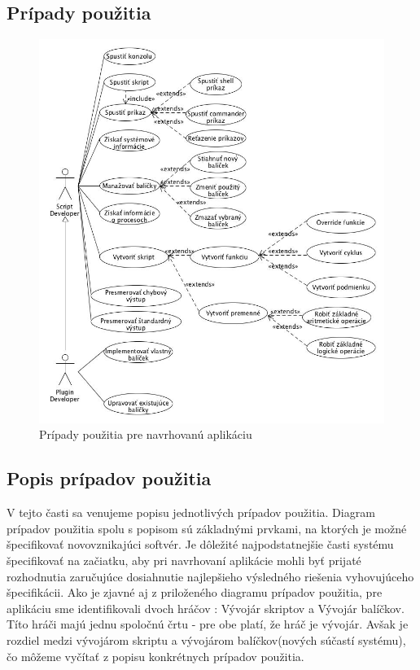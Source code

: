 \subsection{Prípady použitia}
\begin{figure}[!htbp]
	\centering
	\includegraphics[width=\linewidth]{img/usecase.jpg}
	\caption{Prípady použitia pre navrhovanú aplikáciu}
	\label{fig:test}
\end{figure}
\newpage
\subsection{Popis prípadov použitia}
\indent V tejto časti sa venujeme popisu jednotlivých prípadov použitia. Diagram prípadov použitia spolu s popisom sú základnými prvkami, na ktorých je možné špecifikovať novovznikajúci softvér. Je dôležité najpodstatnejšie časti systému špecifikovať na začiatku, aby pri navrhovaní aplikácie mohli byť prijaté rozhodnutia zaručujúce dosiahnutie najlepšieho výsledného riešenia vyhovujúceho špecifikácii. Ako je zjavné aj z priloženého diagramu prípadov použitia, pre aplikáciu sme identifikovali dvoch hráčov : Vývojár skriptov a Vývojár balíčkov. Títo hráči majú jednu spoločnú črtu - pre obe platí, že hráč je vývojár. Avšak je rozdiel medzi vývojárom skriptu a vývojárom balíčkov(nových súčastí systému), čo môžeme vyčítať z popisu konkrétnych prípadov použitia.
